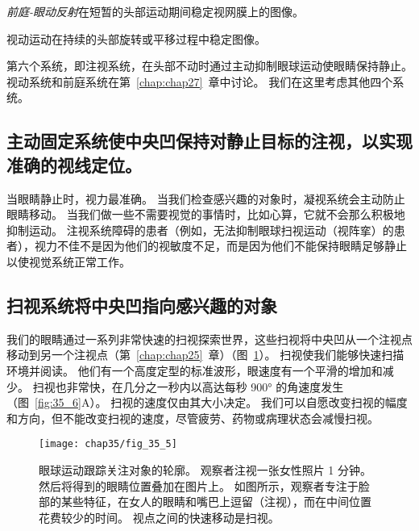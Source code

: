 \textit{前庭-眼动反射}在短暂的头部运动期间稳定视网膜上的图像。


视动运动在持续的头部旋转或平移过程中稳定图像。


第六个系统，即注视系统，在头部不动时通过主动抑制眼球运动使眼睛保持静止。
视动系统和前庭系统在第~\ref{chap:chap27}~章中讨论。
我们在这里考虑其他四个系统。



\subsection{主动固定系统使中央凹保持对静止目标的注视，以实现准确的视线定位。}

当眼睛静止时，视力最准确。
当我们检查感兴趣的对象时，凝视系统会主动防止眼睛移动。
当我们做一些不需要视觉的事情时，比如心算，它就不会那么积极地抑制运动。
注视系统障碍的患者（例如，无法抑制眼球扫视运动（视阵挛）的患者），视力不佳不是因为他们的视敏度不足，而是因为他们不能保持眼睛足够静止以使视觉系统正常工作。



\subsection{扫视系统将中央凹指向感兴趣的对象}

我们的眼睛通过一系列非常快速的扫视探索世界，这些扫视将中央凹从一个注视点移动到另一个注视点（第~\ref{chap:chap25}~章）（图~\ref{fig:35_5}）。
扫视使我们能够快速扫描环境并阅读。 
他们有一个高度定型的标准波形，眼速度有一个平滑的增加和减少。
扫视也非常快，在几分之一秒内以高达每秒 900° 的角速度发生（图~\ref{fig:35_6}A）。
扫视的速度仅由其大小决定。
我们可以自愿改变扫视的幅度和方向，但不能改变扫视的速度，尽管疲劳、药物或病理状态会减慢扫视。


\begin{figure}[htbp]
	\centering
	\texttt{[image: chap35/fig\_35\_5]}
	\caption{眼球运动跟踪关注对象的轮廓。
		观察者注视一张女性照片 1 分钟。
		然后将得到的眼睛位置叠加在图片上。
		如图所示，观察者专注于脸部的某些特征，在女人的眼睛和嘴巴上逗留（注视），而在中间位置花费较少的时间。 
		视点之间的快速移动是扫视\cite{yarbus2013eye}。}
	\label{fig:35_5}
\end{figure}


